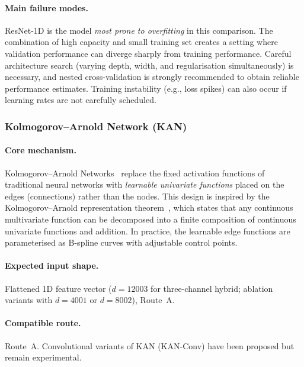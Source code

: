 \paragraph{Main failure modes.}
ResNet-1D is the model \emph{most prone to overfitting} in this
comparison.  The combination of high capacity and small training set
creates a setting where validation performance can diverge sharply
from training performance.  Careful architecture search (varying
depth, width, and regularisation simultaneously) is necessary, and
nested cross-validation is strongly recommended to obtain reliable
performance estimates.  Training instability (e.g., loss spikes) can
also occur if learning rates are not carefully scheduled.


\subsubsection{Kolmogorov--Arnold Network (KAN)}\label{subsec:kan}

\paragraph{Core mechanism.}
Kolmogorov--Arnold Networks~\cite{liu2024kan} replace the fixed
activation functions of traditional neural networks with
\emph{learnable univariate functions} placed on the edges (connections)
rather than the nodes.  This design is inspired by the
Kolmogorov--Arnold representation theorem~\cite{kolmogorov1957representation},
which states that any continuous multivariate function can be
decomposed into a finite composition of continuous univariate functions
and addition.  In practice, the learnable edge functions are
parameterised as B-spline curves with adjustable control points.

\paragraph{Expected input shape.}
Flattened 1D feature vector ($d = 12003$ for three-channel hybrid;
ablation variants with $d = 4001$ or $d = 8002$), Route~A.

\paragraph{Compatible route.}
Route~A.  Convolutional variants of KAN (KAN-Conv) have been proposed
but remain experimental.

